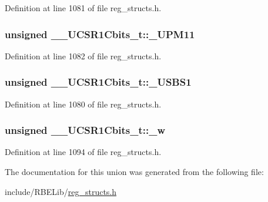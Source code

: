 Definition at line 1081 of file reg\+\_\+structs.\+h.

\hypertarget{union_____u_c_s_r1_cbits__t_a257750ea1eb4c2d0e3da9a5bfad866d0}{
\subsubsection[{\+\_\+\+U\+P\+M11}]{\setlength{\rightskip}{0pt plus 5cm}unsigned \+\_\+\+\_\+\+U\+C\+S\+R1\+Cbits\+\_\+t\+::\+\_\+\+U\+P\+M11}}\label{union_____u_c_s_r1_cbits__t_a257750ea1eb4c2d0e3da9a5bfad866d0}


Definition at line 1082 of file reg\+\_\+structs.\+h.

\hypertarget{union_____u_c_s_r1_cbits__t_a1593db7efc37eb437532412bb7919a25}{
\subsubsection[{\+\_\+\+U\+S\+B\+S1}]{\setlength{\rightskip}{0pt plus 5cm}unsigned \+\_\+\+\_\+\+U\+C\+S\+R1\+Cbits\+\_\+t\+::\+\_\+\+U\+S\+B\+S1}}\label{union_____u_c_s_r1_cbits__t_a1593db7efc37eb437532412bb7919a25}


Definition at line 1080 of file reg\+\_\+structs.\+h.

\hypertarget{union_____u_c_s_r1_cbits__t_a17c7499f606cabec5ba1713d7de53833}{
\subsubsection[{\+\_\+w}]{\setlength{\rightskip}{0pt plus 5cm}unsigned \+\_\+\+\_\+\+U\+C\+S\+R1\+Cbits\+\_\+t\+::\+\_\+w}}\label{union_____u_c_s_r1_cbits__t_a17c7499f606cabec5ba1713d7de53833}


Definition at line 1094 of file reg\+\_\+structs.\+h.



The documentation for this union was generated from the following file\+:\begin{DoxyCompactItemize}
\item 
include/\+R\+B\+E\+Lib/\hyperlink{reg__structs_8h}{reg\+\_\+structs.\+h}\end{DoxyCompactItemize}

